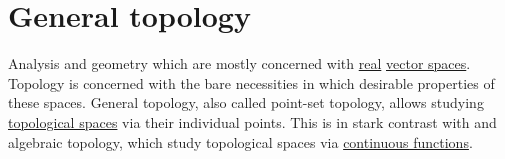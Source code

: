 \section{General topology}\label{sec:general_topology}

Analysis and geometry which are mostly concerned with \hyperref[def:set_of_real_numbers]{real} \hyperref[def:vector_space]{vector spaces}. Topology is concerned with the bare necessities in which desirable properties of these spaces. General topology, also called point-set topology, allows studying \hyperref[def:topological_space]{topological spaces} via their individual points. This is in stark contrast with  and algebraic topology, which study topological spaces via \hyperref[def:global_continuity]{continuous functions}.
